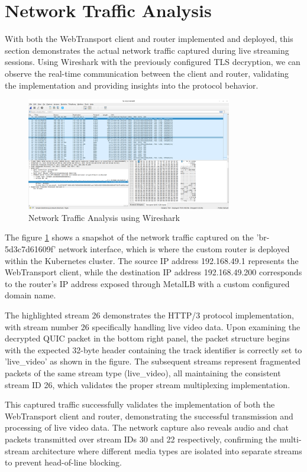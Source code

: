 \section{Network Traffic Analysis}
With both the WebTransport client and router implemented and deployed, this section demonstrates the actual network traffic captured during live streaming sessions. Using Wireshark with the previously configured TLS decryption, we can observe the real-time communication between the client and router, validating the implementation and providing insights into the protocol behavior.
\begin{figure}[h]
    \centering
    \includegraphics[width=0.8\textwidth]{implementation/network_traffic_analysis.png}
    \caption{Network Traffic Analysis using Wireshark}
    \label{fig:network_traffic_analysis}
\end{figure}


The figure \ref{fig:network_traffic_analysis} shows a snapshot of the network traffic captured on the 'br-5d3c7d61609f' network interface, which is where the custom router is deployed within the Kubernetes cluster. The source IP address 192.168.49.1 represents the WebTransport client, while the destination IP address 192.168.49.200 corresponds to the router's IP address exposed through MetalLB with a custom configured domain name.

The highlighted stream 26 demonstrates the HTTP/3 protocol implementation, with stream number 26 specifically handling live video data. Upon examining the decrypted QUIC packet in the bottom right panel, the packet structure begins with the expected 32-byte header containing the track identifier is correctly set to 'live\_video' as shown in the figure. The subsequent streams represent fragmented packets of the same stream type (live\_video), all maintaining the consistent stream ID 26, which validates the proper stream multiplexing implementation.

This captured traffic successfully validates the implementation of both the WebTransport client and router, demonstrating the successful transmission and processing of live video data. The network capture also reveals audio and chat packets transmitted over stream IDs 30 and 22 respectively, confirming the multi-stream architecture where different media types are isolated into separate streams to prevent head-of-line blocking.





